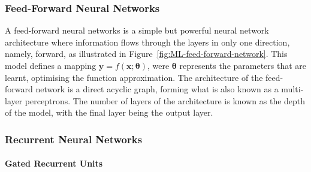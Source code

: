 \subsubsection{Feed-Forward Neural Networks}

A feed-forward neural networks is a simple but powerful neural network architecture where information flows through the layers in only one direction, namely, forward, as illustrated in Figure~\ref{fig:ML-feed-forward-network}.
This model defines a mapping $\mathbf{y} = f(\mathbf{x};\mathbf{\theta})$, were $\mathbf{\theta}$ represents the parameters that are learnt, optimising the function approximation.
The architecture of the feed-forward network is a direct acyclic graph, forming what is also known as a multi-layer perceptrons.
The number of layers of the architecture is known as the depth of the model, with the final layer being the output layer.

\subsubsection{Recurrent Neural Networks}


\paragraph{Gated Recurrent Units}

